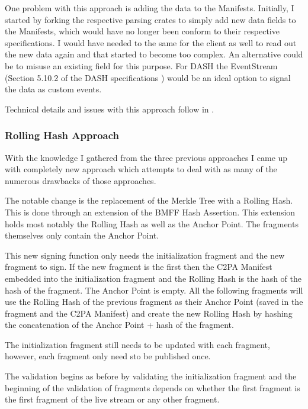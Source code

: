 One problem with this approach is adding the data to the Manifests. Initially, I started by forking the respective parsing crates to simply add new data fields to the Manifests, which would have no longer been conform to their respective specifications. I would have needed to the same for the client as well to read out the new data again and that started to become too complex. An alternative could be to misuse an existing field for this purpose. For DASH the EventStream (Section 5.10.2 of the DASH specifications \cite{DASH})  would be an ideal option to signal the data as custom events. 

Technical details and issues with this approach follow in .

\subsubsection{Rolling Hash Approach}

With the knowledge I gathered from the three previous approaches I came up with completely new approach which attempts to deal with as many of the numerous drawbacks of those approaches.

The notable change is the replacement of the Merkle Tree with a Rolling Hash. This is done through an extension of the BMFF Hash Assertion. This extension holds most notably the Rolling Hash as well as the Anchor Point. The fragments themselves only contain the Anchor Point.

This new signing function only needs the initialization fragment and the new fragment to sign. If the new fragment is the first then the C2PA Manifest embedded into the initialization fragment and the Rolling Hash is the hash of the hash of the fragment. The Anchor Point is empty. All the following fragments will use the Rolling Hash of the previous fragment as their Anchor Point (saved in the fragment and the C2PA Manifest) and create the new Rolling Hash by hashing the concatenation of the Anchor Point + hash of the fragment.

The initialization fragment still needs to be updated with each fragment, however, each fragment only need sto be published once.

The validation begins as before by validating the initialization fragment and the beginning of the validation of fragments depends on whether the first fragment is the first fragment of the live stream or any other fragment. 


